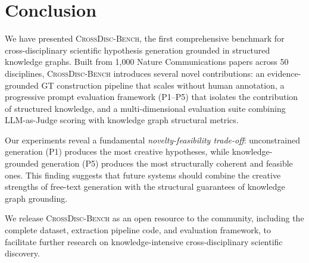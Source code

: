 \documentclass{article}
\newcommand{\ours}{\textsc{CrossDisc-Bench}}
\begin{document}
\section{Conclusion}
\label{sec:conclusion}

We have presented \ours{}, the first comprehensive benchmark for cross-disciplinary scientific hypothesis generation grounded in structured knowledge graphs.
Built from 1{,}000 Nature Communications papers across 50 disciplines, \ours{} introduces several novel contributions: an evidence-grounded GT construction pipeline that scales without human annotation, a progressive prompt evaluation framework (P1--P5) that isolates the contribution of structured knowledge, and a multi-dimensional evaluation suite combining LLM-as-Judge scoring with knowledge graph structural metrics.

Our experiments reveal a fundamental \emph{novelty-feasibility trade-off}: unconstrained generation (P1) produces the most creative hypotheses, while knowledge-grounded generation (P5) produces the most structurally coherent and feasible ones.
This finding suggests that future systems should combine the creative strengths of free-text generation with the structural guarantees of knowledge graph grounding.

We release \ours{} as an open resource to the community, including the complete dataset, extraction pipeline code, and evaluation framework, to facilitate further research on knowledge-intensive cross-disciplinary scientific discovery.


% 
\end{document}
